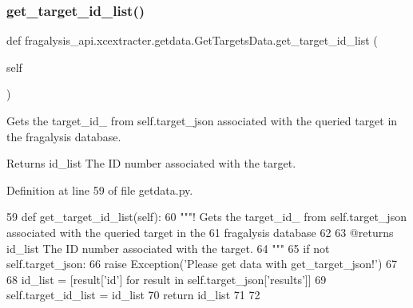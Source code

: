 \subsubsection{\texorpdfstring{get\+\_\+target\+\_\+id\+\_\+list()}{get\_target\_id\_list()}}
{\footnotesize\ttfamily def fragalysis\+\_\+api.\+xcextracter.\+getdata.\+Get\+Targets\+Data.\+get\+\_\+target\+\_\+id\+\_\+list (\begin{DoxyParamCaption}\item[{}]{self }\end{DoxyParamCaption})}



Gets the target\+\_\+id\+\_\+ from self.\+target\+\_\+json associated with the queried target in the fragalysis database. 

\begin{DoxyReturn}{Returns}
id\+\_\+list The ID number associated with the target. 
\end{DoxyReturn}


Definition at line 59 of file getdata.\+py.


\begin{DoxyCode}
59     \textcolor{keyword}{def }get\_target\_id\_list(self):
60         \textcolor{stringliteral}{"""! Gets the target\_id\_ from self.target\_json associated with the queried target in the }
61 \textcolor{stringliteral}{            fragalysis database}
62 \textcolor{stringliteral}{}
63 \textcolor{stringliteral}{        @returns id\_list The ID number associated with the target.}
64 \textcolor{stringliteral}{        """}
65         \textcolor{keywordflow}{if} \textcolor{keywordflow}{not} self.target\_json:
66             \textcolor{keywordflow}{raise} Exception(\textcolor{stringliteral}{'Please get data with get\_target\_json!'})
67 
68         id\_list = [result[\textcolor{stringliteral}{'id'}] \textcolor{keywordflow}{for} result \textcolor{keywordflow}{in} self.target\_json[\textcolor{stringliteral}{'results'}]]
69         self.target\_id\_list = id\_list
70         \textcolor{keywordflow}{return} id\_list
71 
72 
\end{DoxyCode}
\mbox{\label{classfragalysis__api_1_1xcextracter_1_1getdata_1_1_get_targets_data_ab67e7a9bfced7f671422ef8f4b6997c9}} 
